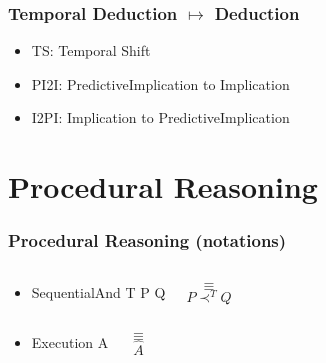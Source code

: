 \documentclass[aspectratio=169]{beamer}
\begin{document}
\begin{frame}
  \frametitle{Temporal Deduction $\mapsto$ Deduction}
  {\small
    \begin{prooftree}
    \end{prooftree}}

  \begin{itemize}
  \item TS: Temporal Shift
  \item PI2I: PredictiveImplication to Implication
  \item I2PI: Implication to PredictiveImplication
  \end{itemize}
\end{frame}

\section{Procedural Reasoning}

\begin{frame}[fragile]
  \frametitle{Procedural Reasoning (notations)}
  \begin{itemize}
  \item<+->
  \begin{columns}
    \column{1in}
\begin{semiverbatim}
SequentialAnd
  T
  P
  Q
\end{semiverbatim}
    \column{0.5in}
    $$\equiv$$
    \column{1in}
    $$P \prec^T Q$$
  \end{columns}

  \item<+->
  \begin{columns}
    \column{1in}
\begin{semiverbatim}
Execution
  A
\end{semiverbatim}
    \column{0.5in}
    $$\equiv$$
    \column{1in}
    $$\widehat{A}$$
  \end{columns}
  \end{itemize}
\end{frame}
\end{document}
